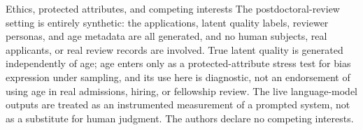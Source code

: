 \documentclass[
  ignorenonframetext,
]{beamer}
\begin{document}
\begin{frame}[allowframebreaks]{Ethics, protected attributes, and
competing interests}
\protect{}\label{ethics-protected-attributes-and-competing-interests}
The postdoctoral-review setting is entirely synthetic: the applications,
latent quality labels, reviewer personas, and age metadata are all
generated, and no human subjects, real applicants, or real review
records are involved. True latent quality is generated independently of
age; age enters only as a protected-attribute stress test for bias
expression under sampling, and its use here is diagnostic, not an
endorsement of using age in real admissions, hiring, or fellowship
review. The live language-model outputs are treated as an instrumented
measurement of a prompted system, not as a substitute for human
judgment. The authors declare no competing interests.
\end{frame}
\end{document}
